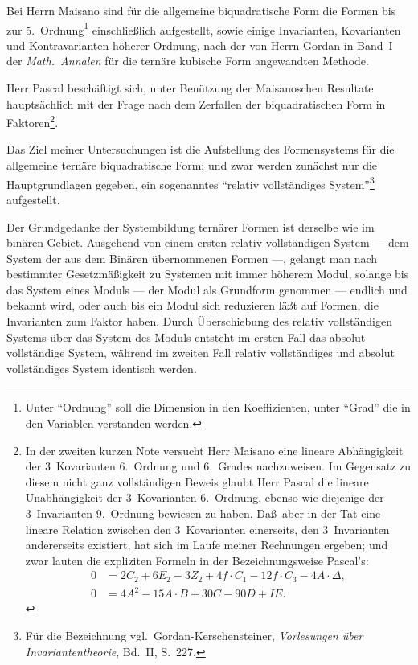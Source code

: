 \documentclass[11pt,a4paper]{article}
\theoremstyle{plain}
\theoremstyle{definition}
\begin{document}
Bei Herrn Maisano sind f\"ur die allgemeine biquadratische Form die Formen bis zur 5.~Ordnung\footnote{Unter ``Ordnung'' soll die Dimension in den Koeffizienten, unter ``Grad'' die in den Variablen verstanden werden.} einschlie\ss lich aufgestellt, sowie einige Invarianten, Kovarianten und Kontravarianten h\"oherer Ordnung, nach der von Herrn Gordan in Band~I der \textit{Math.~Annalen} f\"ur die tern\"are kubische Form angewandten Methode.

Herr Pascal besch\"aftigt sich, unter Ben\"utzung der Maisanoschen Resultate haupts\"achlich mit der Frage nach dem Zerfallen der biquadratischen Form in Faktoren\footnote{In der zweiten kurzen Note versucht Herr Maisano eine lineare Abh\"angigkeit der 3~Kovarianten 6.~Ordnung und 6.~Grades nachzuweisen. Im Gegensatz zu diesem nicht ganz vollst\"andigen Beweis glaubt Herr Pascal die lineare Unabh\"angigkeit der 3~Kovarianten 6.~Ordnung, ebenso wie diejenige der 3~Invarianten 9.~Ordnung bewiesen zu haben. Da\ss\ aber in der Tat eine lineare Relation zwischen den 3~Kovarianten einerseits, den 3~Invarianten andererseits existiert, hat sich im Laufe meiner Rechnungen ergeben; und zwar lauten die expliziten Formeln in der Bezeichnungsweise Pascal's:
\begin{align*}
0 &= 2C_2 + 6E_2 - 3Z_2 + 4f \cdot C_1 - 12f \cdot C_3 - 4A \cdot \varDelta,\\
0 &= 4A^2 - 15A \cdot B + 30C - 90D + IE.
\end{align*}}.

Das Ziel meiner Untersuchungen ist die Aufstellung des Formensystems f\"ur die allgemeine tern\"are biquadratische Form; und zwar werden zun\"achst nur die Hauptgrundlagen gegeben, ein sogenanntes ``relativ vollst\"andiges System''\footnote{F\"ur die Bezeichnung vgl.~Gordan-Kerschensteiner, \textit{Vorlesungen \"uber Invariantentheorie}, Bd.~II, S.~227.} aufgestellt.

Der Grundgedanke der Systembildung tern\"arer Formen ist derselbe wie im bin\"aren Gebiet. Ausgehend von einem ersten relativ vollst\"andigen System --- dem System der aus dem Bin\"aren \"ubernommenen Formen ---, gelangt man nach bestimmter Gesetzm\"a\ss igkeit zu Systemen mit immer h\"oherem Modul, solange bis das System eines Moduls --- der Modul als Grundform genommen --- endlich und bekannt wird, oder auch bis ein Modul sich reduzieren l\"a\ss t auf Formen, die Invarianten zum Faktor haben. Durch \"Uberschiebung des relativ vollst\"andigen Systems \"uber das System des Moduls entsteht im ersten Fall das absolut vollst\"andige System, w\"ahrend im zweiten Fall relativ vollst\"andiges und absolut vollst\"andiges System identisch werden.
\end{document}
